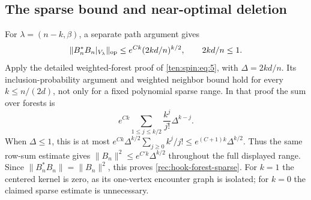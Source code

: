 \subsection{The sparse bound and near-optimal deletion}

For $\lambda=(n-k,\beta)$, a separate path argument gives
\begin{equation}\label{rec:hook-forest-sparse}
 \|B_n^*B_n|_{V_\lambda}\|_{\mathrm{op}}
 \le e^{Ck}(2kd/n)^{k/2},\qquad 2kd/n\le1.
\end{equation}
Apply the detailed weighted-forest proof of \eqref{ten:spin:eq:5},
with $\Delta=2kd/n$. Its inclusion-probability argument and weighted
neighbor bound hold for every $k\le n/(2d)$, not only for a fixed
polynomial sparse range. In that proof the sum over forests is
\[
 e^{Ck}\sum_{1\le j\le k/2}\frac{k^j}{j!}\Delta^{k-j}.
\]
When $\Delta\le1$, this is at most
$e^{Ck}\Delta^{k/2}\sum_{j\ge0}k^j/j!
\le e^{(C+1)k}\Delta^{k/2}$.
Thus the same row-sum estimate gives
$\|B_n\|^2\le e^{C'k}\Delta^{k/2}$ throughout the full displayed
range. Since $\|B_n^*B_n\|=\|B_n\|^2$, this proves
\eqref{rec:hook-forest-sparse}. For $k=1$ the centered kernel is zero,
as its one-vertex encounter graph is isolated; for $k=0$ the claimed
sparse estimate is unnecessary.

